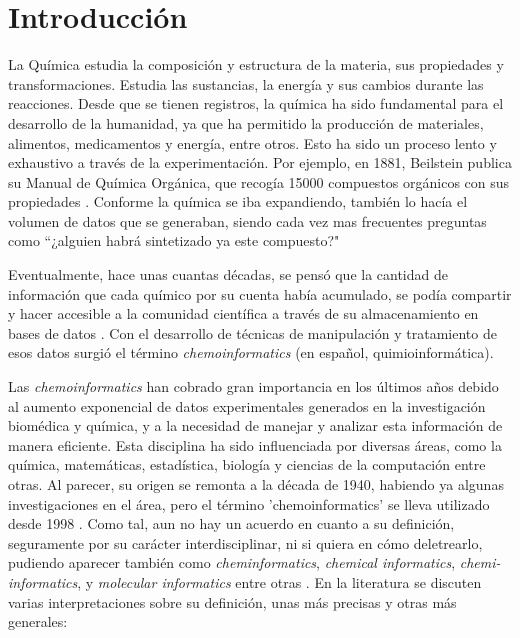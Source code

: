 \chapter{Introducción} \label{introduccion}


La Química estudia la composición y estructura de la materia, sus propiedades y transformaciones. Estudia las sustancias, la energía y sus cambios durante las reacciones. Desde que se tienen registros, la química ha sido fundamental para el desarrollo de la humanidad, ya que ha permitido la producción de materiales, alimentos, medicamentos y energía, entre otros. Esto ha sido un proceso lento y exhaustivo a través de la experimentación. Por ejemplo, en 1881, Beilstein publica su Manual de Química Orgánica, que recogía 15000 compuestos orgánicos con sus propiedades \cite{handbook_1881}. Conforme la química se iba expandiendo, también lo hacía el volumen de datos que se generaban, siendo cada vez mas frecuentes preguntas como ``¿alguien habrá sintetizado ya este compuesto?" \cite{applied_chemo_intro}

Eventualmente, hace unas cuantas décadas, se pensó que la cantidad de información que cada químico por su cuenta había acumulado, se podía compartir y hacer accesible a la comunidad científica a través de su almacenamiento en bases de datos \cite{chemo_a_textbook}. Con el desarrollo de técnicas de manipulación y tratamiento de esos datos surgió el término \emph{chemoinformatics} (en español, quimioinformática).

Las \emph{chemoinformatics} han cobrado gran importancia en los últimos años debido al aumento exponencial de datos experimentales generados en la investigación biomédica y química, y a la necesidad de manejar y analizar esta información de manera eficiente.
Esta disciplina ha sido influenciada por diversas áreas, como la química, matemáticas, estadística, biología y ciencias de la computación entre otras. Al parecer, su origen se remonta a la década de 1940, habiendo ya algunas investigaciones en el área, pero el término 'chemoinformatics' se lleva utilizado desde 1998 \cite{leach_introduction_2007}. Como tal, aun no hay un acuerdo en cuanto a su definición, seguramente por su carácter interdisciplinar, ni si quiera en cómo deletrearlo, pudiendo aparecer también como \emph{cheminformatics}, \emph{chemical informatics}, \emph{chemi-informatics}, y \emph{molecular informatics} entre otras \cite{leach_introduction_2007, brown_chemoinformaticsintroduction_2009}. En la literatura se discuten varias interpretaciones sobre su definición, unas más precisas y otras más generales: \cite{leach_introduction_2007, basic_overview_chemo, brown_chemoinformaticsintroduction_2009, chemo_a_textbook}


